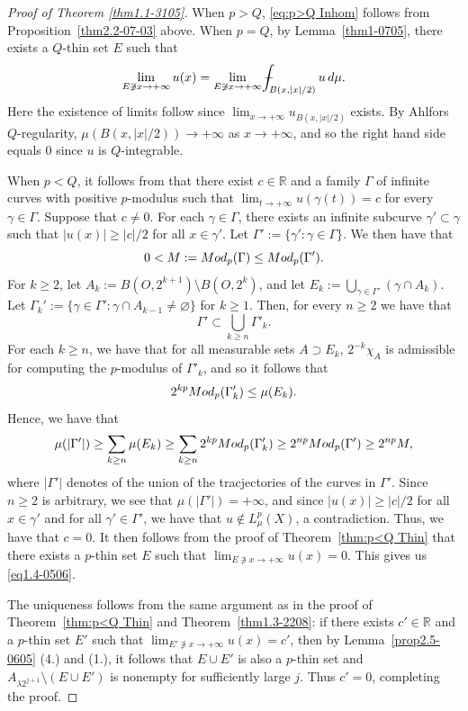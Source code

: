 \documentclass[10pt]{amsart}
\def\Xint#1{\mathchoice
	{\XXint\displaystyle\textstyle{#1}}
	{\XXint\textstyle\scriptstyle{#1}}
	{\XXint\scriptstyle\scriptscriptstyle{#1}}
	{\XXint\scriptscriptstyle\scriptscriptstyle{#1}}
	\!\int}
\def\XXint#1#2#3{{\setbox0=\hbox{$#1{#2#3}{\int}$ }
		\vcenter{\hbox{$#2#3$ }}\kern-.6\wd0}}
\def\dashint{\Xint-}
\numberwithin{equation}{section}
\newcommand{\Mod}{{\rm Mod}}
\newcommand{\R}{\mathbb{R}}
\begin{document}
\begin{proof}[Proof of Theorem \ref{thm1.1-3105}] When $p>Q$, \eqref{eq:p>Q Inhom} follows from Proposition~\ref{thm2.2-07-03} above. When $p=Q$, by Lemma~\ref{thm1-0705}, there exists a $Q$-thin set $E$ such that
\[
\lim_{E\not\ni x\to+\infty}u(x)= \lim_{E\not\ni x\to+\infty}\dashint_{B(x,|x|/2)}u\,d\mu.
\]
Here the existence of limits follow since $\lim_{x\to+\infty}u_{B(x,|x|/2)}$ exists.
By Ahlfors $Q$-regularity, $\mu(B(x,|x|/2))\to +\infty$ as $x\to+\infty$, and so the right hand side equals $0$ since $u$ is $Q$-integrable.  


When $p<Q$, it follows from \cite{KN22} that there exist $c\in\R$ and a family $\Gamma$ of infinite curves with positive $p$-modulus such that $\lim_{t\to+\infty}u(\gamma(t))=c$ for every $\gamma\in\Gamma$.  Suppose that $c\ne 0$.  For each $\gamma\in\Gamma$, there exists an infinite subcurve $\gamma'\subset\gamma$ such that $|u(x)|\ge |c|/2$ for all $x\in \gamma'$.  Let $\Gamma':=\{\gamma':\gamma\in\Gamma\}$.  We then have that 
\[
0<M:=\Mod_p(\Gamma)\le\Mod_p(\Gamma').
\]
For $k\ge 2$, let $A_k:=B(O,2^{k+1})\setminus B(O,2^k)$, and let $E_k:=\bigcup_{\gamma\in\Gamma'}(\gamma\cap A_k)$.  Let $\Gamma_k':=\{\gamma\in\Gamma':\gamma\cap A_{k-1}\ne\varnothing\}$ for $k\ge 1$.  Then, for every $n\ge 2$ we have that 
\[
\Gamma'\subset\bigcup_{k\ge n}\Gamma'_k.
\]
For each $k\ge n$, we have that  for all measurable sets $A\supset E_k$, 
$2^{-k}\chi_{A}$ is admissible for computing the $p$-modulus of $\Gamma'_k$, and so it follows that 
\[
2^{kp}\Mod_{p}(\Gamma'_k)\le\mu(E_k).
\]
Hence, we have that 
\[
\mu(|\Gamma'|)\ge\sum_{k\ge n}\mu(E_k)\ge\sum_{k\ge n}2^{kp}\Mod_p(\Gamma'_k)\ge 2^{np}\Mod_p(\Gamma')\ge2^{np}M,
\]
where $|\Gamma'|$ denotes of the union of the tracjectories of the curves in $\Gamma'$.  Since $n\ge 2$ is arbitrary, we see that $\mu(|\Gamma'|)=+\infty$, and since $|u(x)|\ge |c|/2$ for all $x\in \gamma'$ and for all $\gamma'\in\Gamma'$, we have that $u\not\in L^p_\mu(X)$, a contradiction.  Thus, we have that $c=0$. 
It then follows from the proof of Theorem~\ref{thm:p<Q Thin} that there exists a $p$-thin set $E$ such that $\lim_{E\not\ni x\to+\infty}u(x)=0$.  This gives us \eqref{eq1.4-0506}.  


The uniqueness follows from the same argument as in the proof of Theorem~\ref{thm:p<Q Thin} and Theorem~\ref{thm1.3-2208}: if there exists $c'\in\R$ and a $p$-thin set $E'$ such that $\lim_{E'\not\ni x\to+\infty}u(x)=c'$, then by Lemma~\ref{prop2.5-0605} (4.) and (1.), it follows that 
$E\cup E'$ is also a $p$-thin set and $A_{\lambda 2^{j+1}}\setminus (E\cup E')$ is nonempty for sufficiently large $j$.  Thus $c'=0$, completing the proof.
\end{proof}
\end{document}
